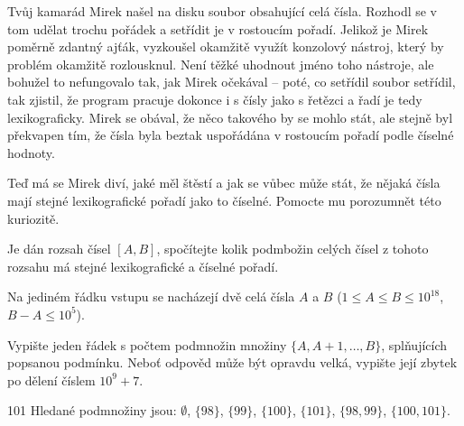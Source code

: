 





Tvůj kamarád Mirek našel na disku soubor obsahující celá čísla.
Rozhodl se v tom udělat trochu pořádek a setřídit je v rostoucím pořadí.
Jelikož je Mirek poměrně zdantný ajťák, vyzkoušel okamžitě využít konzolový nástroj,
který by problém okamžitě rozlousknul. Není těžké uhodnout jméno toho nástroje,
ale bohužel to nefungovalo tak, jak Mirek očekával
-- poté, co setřídil soubor setřídil, tak zjistil, že program pracuje
dokonce i s čísly jako s řetězci a řadí je tedy lexikograficky.
Mirek se obával, že něco takového by se mohlo stát, ale stejně byl překvapen tím,
že čísla byla beztak uspořádána v rostoucím pořadí podle číselné hodnoty.

Teď má se Mirek diví, jaké měl štěstí a jak se vůbec může stát,
že nějaká čísla mají stejné lexikografické pořadí jako to číselné.
Pomocte mu porozumnět této kuriozitě.


Je dán rozsah čísel $[A, B]$, spočítejte kolik podmbožin celých čísel z tohoto rozsahu
má stejné lexikografické a číselné pořadí.


Na jediném řádku vstupu se nacházejí dvě celá čísla $A$ a $B$
($1 \le A \le B \le 10^{18}$, $B - A \le 10^5$).


Vypište jeden řádek s počtem podmnožin množiny $\{A, A+1, \ldots, B\}$,
splňujících popsanou podmínku.
Neboť odpověd může být opravdu velká, vypište její zbytek po dělení číslem $10^9 + 7$.


 101
\sampleCOMMENT
Hledané podmnožiny jsou: $\emptyset$, $\{98\}$, $\{99\}$, $\{100\}$, $\{101\}$, $\{98, 99\}$, $\{100, 101\}$.
\sampleEND



